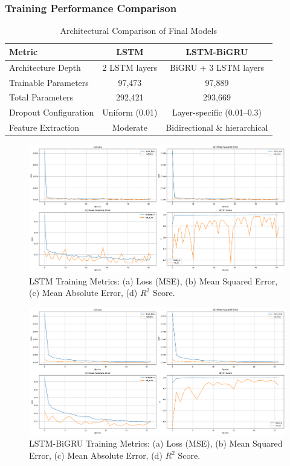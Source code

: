 \subsubsection{Training Performance Comparison}

\begin{table}[H]
\centering
\caption{Architectural Comparison of Final Models}
\label{tab:model-comparison}
\begin{tabular}{lcc}
\hline
\textbf{Metric} & \textbf{LSTM} & \textbf{LSTM-BiGRU} \\
\hline\hline
Architecture Depth        & 2 LSTM layers           & BiGRU + 3 LSTM layers \\
Trainable Parameters      & 97,473                  & 97,889 \\
Total Parameters          & 292,421                 & 293,669 \\
Dropout Configuration     & Uniform (0.01)          & Layer-specific (0.01–0.3) \\
Feature Extraction        & Moderate                & Bidirectional \& hierarchical \\
\hline
\end{tabular}
\end{table}


\begin{figure}[H]
\centering
\caption{LSTM Training Metrics: (a) Loss (MSE), (b) Mean Squared Error, (c) Mean Absolute Error, (d) $R^2$ Score.}
\label{fig:lstm-training-performance}
\includegraphics[width=\textwidth]{img/sections/main/best_lstm_training.png}
\end{figure}

\begin{figure}[H]
\centering
\caption{LSTM-BiGRU Training Metrics: (a) Loss (MSE), (b) Mean Squared Error, (c) Mean Absolute Error, (d) $R^2$ Score.}
\label{fig:bigru-training-performance}
\includegraphics[width=\textwidth]{img/sections/main/best_lstmbigru_training.png}
\end{figure}

